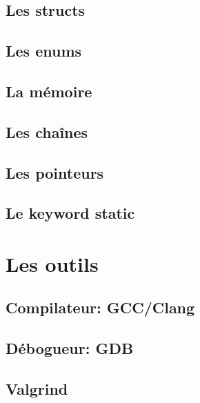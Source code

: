 \documentclass{beamer}
\begin{document}
\begin{darkframes}
  	\subsection{Les structs}
  	\begin{frame}
  		
  	\end{frame}
  	
  	\subsection{Les enums}
  	\subsection{La mémoire}
  	\subsection{Les chaînes}
  	\subsection{Les pointeurs}
  	\subsection{Le keyword static}
  	
  	\section{Les outils}
  	\subsection{Compilateur: GCC/Clang}
  	\subsection{Débogueur: GDB}
  	\subsection{Valgrind}
  	
  	
  	
  	
  	
  	
  	
  	
  	
  	
  	
  	
  	
  	
  	
  	
  	
  	
  	

\end{darkframes}
\end{document}
